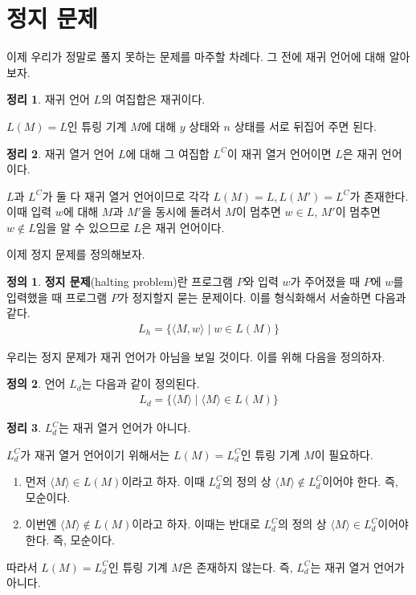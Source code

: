\documentclass[b5paper]{book}
\theoremstyle{definition}
\newtheorem{defn}{정의}[chapter]
\newtheorem{thm}{정리}[chapter]
\newenvironment{pf*}{\pushQED{\qed}\pf}{\popQED\endpf}
\begin{document}
\section{정지 문제}
이제 우리가 정말로 풀지 못하는 문제를 마주할 차례다. 그 전에 재귀 언어에 대해 알아보자.
\begin{thm}
    재귀 언어 $L$의 여집합은 재귀이다.
\end{thm}
\begin{pf*}
    $L(M) = L$인 튜링 기계 $M$에 대해 $y$ 상태와 $n$ 상태를 서로 뒤집어 주면 된다.
\end{pf*}
\begin{thm}
    재귀 열거 언어 $L$에 대해 그 여집합 $L^C$이 재귀 열거 언어이면 $L$은 재귀 언어이다.
\end{thm}
\begin{pf*}
    $L$과 $L^C$가 둘 다 재귀 열거 언어이므로 각각 $L(M) = L, L(M') = L^C$가 존재한다. 이때 입력 $w$에
    대해 $M$과 $M'$을 동시에 돌려서 $M$이 멈추면 $w \in L$, $M'$이 멈추면 $w \notin L$임을 알 수 있으므로
    $L$은 재귀 언어이다. 
\end{pf*}
이제 정지 문제를 정의해보자. 
\begin{defn}
    \textbf{정지 문제}(halting problem)란 프로그램 $P$와 입력 $w$가 주어졌을 때 $P$에 $w$를 입력했을
    때 프로그램 $P$가 정지할지 묻는 문제이다. 이를 형식화해서 서술하면 다음과 같다.
    \begin{align*}
        L_h = \{ \langle M, w \rangle \;\vert\; w \in L(M) \}
    \end{align*}
\end{defn}
우리는 정지 문제가 재귀 언어가 아님을 보일 것이다. 이를 위해 다음을 정의하자.
\begin{defn}
    언어 $L_d$는 다음과 같이 정의된다.
    \begin{align*}
        L_d = \{ \langle M \rangle \;\vert\; \langle M \rangle \in L(M) \}
    \end{align*}
\end{defn}
\begin{thm}
    $L_d^C$는 재귀 열거 언어가 아니다. 
\end{thm}
\begin{pf*}
    $L_d^C$가 재귀 열거 언어이기 위해서는 $L(M) = L_d^C$인 튜링 기계 $M$이 필요하다.
    \begin{enumerate}
        \item  먼저 $\langle M \rangle \in L(M)$이라고 하자. 이때 $L_d^C$의 정의 상 
        $\langle M \rangle \notin L_d^C$이어야
        한다. 즉, 모순이다.
        \item  이번엔 $\langle M \rangle \notin L(M)$이라고 하자. 이때는 반대로 
        $L_d^C$의 정의 상 $\langle M \rangle \in L_d^C$이어야
        한다. 즉, 모순이다. 
    \end{enumerate}
    따라서 $L(M) = L_d^C$인 튜링 기계 $M$은 존재하지 않는다. 즉, $L_d^C$는 재귀 열거 언어가 아니다.
\end{pf*}
\end{document}
